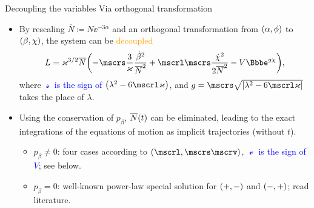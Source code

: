 \documentclass[8pt]{beamer}
\begin{document}
\begin{frame}%
{Decoupling the variables}%
{Via orthogonal transformation}
\begin{itemize}
\item By rescaling $\overline{N} \coloneqq N\ee^{-3\alpha}$ and an
orthogonal transformation from ${\left(\alpha, \phi\right)}$ to ${\left(\beta, \chi\right)}$,
the system can be \textcolor{orange}{decoupled}
\begin{align}
L = \varkappa^{3/2}\overline{N}
\rbr{-\mscrs\frac{3}{\varkappa}\frac{\dot{\beta}^2}{\overline{N}^2}
+\mscrl\mscrs\frac{\dot{\chi}^2}{2\overline{N}^2}
-V\ee^{g \chi}},
\label{eq:lagrangian-decoupled}
\end{align}
where \textcolor{blue}{$\mscrs$ is the sign of $\rbr{\lambda^2 -
6\mscrl\varkappa}$},
and $g = \mscrs\sqrt{\vbr{\lambda^2 -
6\mscrl\varkappa}}$ takes the place of $\lambda$.

\item Using the \alert{conservation of $p_\beta$}, ${\overline{N}}\mathopen{}\left(t\right)\mathclose{}$ can be eliminated, 
leading to the exact integrations of the equations of motion as \alert{implicit 
trajectories} (without $t$).
\begin{itemize}
\item $p_\beta \neq 0$: four cases according to $\rbr{\mscrl, \mscrs \mscrv}$,
\textcolor{blue}{$\mscrv$ is the sign of $V$}; see below.
\item $p_\beta = 0$: well-known power-law special solution for ${\left(+,-\right)}$ 
and ${\left(-,+\right)}$; read literature.
\end{itemize}

\end{itemize}
\end{frame}
\end{document}
